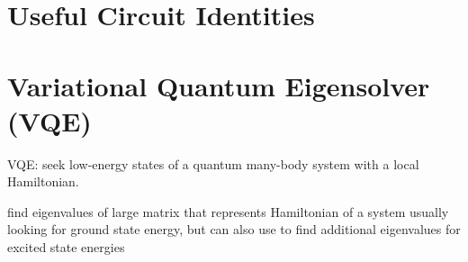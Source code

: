 \documentclass[a4paper,landscape,columns=3]{CheatSheet}
\begin{document}
\section{Useful Circuit Identities}




\section{Variational Quantum Eigensolver (VQE)}


VQE: seek low-energy states of a quantum many-body system with a local Hamiltonian.

find eigenvalues of large matrix that represents Hamiltonian of a system
usually looking for ground state energy, but can also use to find additional eigenvalues for excited state energies
\end{document}
